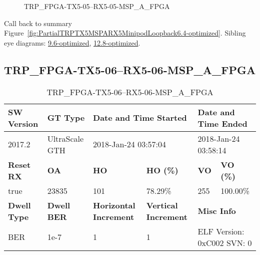 \begin{figure}[h]
\caption{TRP\_FPGA-TX5-05--RX5-05-MSP\_A\_FPGA} \label{fig:TRPFPGATX505RX505MSPAFPGA6.4-optimized}
\end{figure}

Call back to summary Figure~\ref{fig:PartialTRPTX5MSPARX5MinipodLoopback6.4-optimized}.
Sibling eye diagrams: \hyperref[sec:TRPFPGATX505RX505MSPAFPGA9.6-optimized]{9.6-optimized}, \hyperref[sec:TRPFPGATX505RX505MSPAFPGA12.8-optimized]{12.8-optimized}.

\clearpage
\newpage


\subsection{TRP\_FPGA-TX5-06--RX5-06-MSP\_A\_FPGA}\label{sec:TRPFPGATX506RX506MSPAFPGA6.4-optimized}

\begin{table}[h]
\centering
\caption{TRP\_FPGA-TX5-06--RX5-06-MSP\_A\_FPGA}
\label{tab:TRPFPGATX506RX506MSPAFPGA6.4-optimized}
\begin{tabular}{@{}|l|l|l|l|l|l|@{}}
\toprule
\textbf{SW Version}                & \textbf{GT Type}   & \multicolumn{2}{l|}{\textbf{Date and Time Started}}            & \multicolumn{2}{l|}{\textbf{Date and Time Ended}}        \\ \midrule
2017.2                       & UltraScale GTH          & \multicolumn{2}{l|}{2018-Jan-24 03:57:04}                   & \multicolumn{2}{l|}{2018-Jan-24 03:58:14}               \\ \midrule
\textbf{Reset RX}                  & \textbf{OA} & \textbf{HO}   & \textbf{HO (\%)} & \textbf{VO} & \textbf{VO (\%)} \\ \midrule
true & 23835        & 101          & 78.29\%        & 255        & 100.00\%       \\ \midrule
\textbf{Dwell Type}                & \textbf{Dwell BER} & \textbf{Horizontal Increment} & \textbf{Vertical Increment}    & \multicolumn{2}{l|}{\textbf{Misc Info}}                  \\ \midrule
BER                            & 1e-7        & 1        & 1           & \multicolumn{2}{l|}{ELF Version: 0xC002 SVN: 0}                         \\ \bottomrule
\end{tabular}
\end{table}


